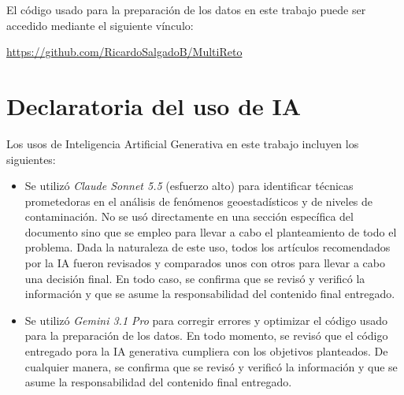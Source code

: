 \documentclass[11pt]{article}
\begin{document}
El código usado para la preparación de los datos en este trabajo puede ser accedido mediante el siguiente vínculo:

\url{https://github.com/RicardoSalgadoB/MultiReto}

\section{Declaratoria del uso de IA}

Los usos de Inteligencia Artificial Generativa en este trabajo incluyen los siguientes:

\begin{itemize}
    \item Se utilizó \textit{Claude Sonnet 5.5} (esfuerzo alto) para identificar técnicas prometedoras en el análisis de fenómenos geoestadísticos y de niveles de contaminación. No se usó directamente en una sección específica del documento sino que se empleo para llevar a cabo el planteamiento de todo el problema. Dada la naturaleza de este uso, todos los artículos recomendados por la IA fueron revisados y comparados unos con otros para llevar a cabo una decisión final. En todo caso, se confirma que se revisó y verificó la información y que se asume la responsabilidad del contenido final entregado.

    \item Se utilizó \textit{Gemini 3.1 Pro} para corregir errores y optimizar el código usado para la preparación de los datos. En todo momento, se revisó que el código entregado pora la IA generativa cumpliera con los objetivos planteados. De cualquier manera, se confirma que se revisó y verificó la información y que se asume la responsabilidad del contenido final entregado.
\end{itemize}

\pagebreak

\nocite{*}


\end{document}
